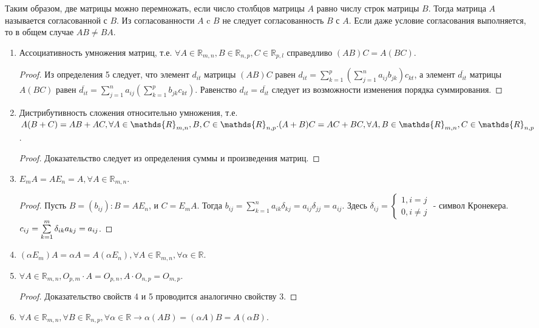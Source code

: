 Таким образом, две матрицы можно перемножать, если число столбцов матрицы $A$ равно числу строк матрицы $B$. Тогда матрица $A$ называется согласованной с $B$. Из согласованности $A$ c $B$ не следует согласованность $B$ с $A$. Если даже условие согласования выполняется, то в общем случае $AB \neq BA$.
\begin{properties}
  \begin{enumerate} $\\$
    \item Ассоциативность умножения матриц, т.е. $\forall A \in \mathds{R}_{m,n}, B \in \mathds{R}_{n,p}, C \in \mathds{R}_{p,l}$ справедливо $(AB)C=A(BC)$.


    \begin{proof}Из определения 5 следует, что элемент $d_{it}$ матрицы $(AB)C$ равен $d_{it} = \sum \limits_{k=1}^p(\sum \limits_{j=1}^n a_{ij}b_{jk})c_{kt}$, а элемент $\overline{d_{it}}$ матрицы $A(BC)$ равен $\overline{d_{it}} = \sum \limits_{j=1}^n a_{ij}(\sum \limits_{k=1}^p b_{jk}c_{kt})$. Равенство $d_{it}=\overline{d_{it}}$ следует из возможности изменения порядка суммирования.\end{proof}
    \item Дистрибутивность сложения относительно умножения, т.е. $\\ A(B+C) = AB +AC, \forall A \in \mathds{R}_{m,n}, B,C \in \mathds{R}_{n,p}. \\ (A + B)C = AC + BC, \forall A,B \in \mathds{R}_{m,n}, C \in \mathds{R}_{n,p}$.

    \begin{proof}
      Доказательство следует из определения суммы и произведения матриц.
    \end{proof}
    \item $E_{m}A = AE_{n} = A, \forall A \in \mathds{R}_{m,n }.$

    \begin{proof}
      Пусть $B=(b_{ij}):B=AE_{n}$, и $C=E_{m}A$. Тогда $b_{ij} = \sum \limits_{k=1}^n a_{ik} \delta_{kj} = a_{ij} \delta_{jj} = a_{ij}$. Здесь $\delta_{ij}= \begin{cases} 1,i=j \\ 0,i \neq j \end{cases}$ - символ Кронекера. $\\ c_{ij} = \sum \limits_{k=1}^m \delta_{ik}a_{kj}=a_{ij}$.
    \end{proof}
    \item $(\alpha E_{m})A= \alpha A = A(\alpha E_{n}), \forall A \in \mathds{R}_{m,n}, \forall \alpha \in \mathds{R}$.
    \item $\forall A \in \mathds{R}_{m,n}, O_{p,m} \cdot A = O_{p,n}, A \cdot O_{n,p} = O_{m,p}.$
    \begin{proof}
    Доказательство свойств 4 и 5 проводится аналогично свойству 3.
  \end{proof}

    \item $\forall A \in \mathds{R}_{m,n}, \forall B \in \mathds{R}_{n,p}, \forall \alpha \in \mathds{R} \rightarrow \alpha(AB) = (\alpha A)B = A(\alpha B)$.
  \end{enumerate}
\end{properties}
